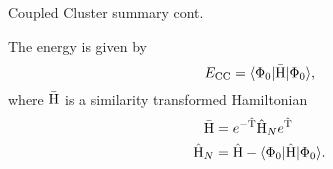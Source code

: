 \begin{frame}{Coupled Cluster summary cont.}

    The energy is given by
    \begin{equation*}
        E_{\mathrm{CC}} = \langle \Phi_0 | \bar{\mathrm{H}} |\Phi_0\rangle,
    \end{equation*}
    where $\bar{\mathrm{H}}$ is a similarity transformed Hamiltonian
    \begin{align*}
        \bar{\mathrm{H}} &= e^{-\hat{\mathrm{T}}} \hat{\mathrm{H}}_N e^{\hat{\mathrm{T}}} \\
        \hat{\mathrm{H}}_N &= \hat{\mathrm{H}} - \langle \Phi_0 | \hat{\mathrm{H}} |\Phi_0\rangle.
    \end{align*}
\end{frame}

    
